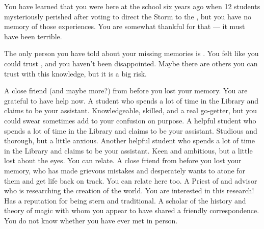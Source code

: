 \documentclass[char]{GL2020}
\begin{document}
\begin{itemz}[Notes]
    \item You have learned that you were here at the school six years ago when 12 students mysteriously perished after voting to direct the Storm to the \pShip{}, but you have no memory of those experiences. You are somewhat thankful for that — it must have been terrible.
    \item The only person you have told about your missing memories is \cInterpol{}. You felt like you could trust \cInterpol{\them}, and you haven’t been disappointed. Maybe there are others you can trust with this knowledge, but it is a big risk.
\end{itemz}

\begin{contacts}
    \contact{\cInterpol{}} A close friend (and maybe more?) from before you lost your memory. You are grateful to have \cInterpol{\their} help now.
    \contact{\cLibAssist{}} A student who spends a lot of time in the Library and claims to be your assistant. Knowledgeable, skilled, and a real go-getter, but you could swear \cLibAssist{\they} sometimes add to your confusion on purpose.
    \contact{\cPresident{}} A helpful student who spends a lot of time in the Library and claims to be your assistant. Studious and thorough, but a little anxious.
    \contact{\cAmbition{}} Another helpful student who spends a lot of time in the Library and claims to be your assistant. Keen and ambitious, but a little lost about the eyes. You can relate.
    \contact{\cChupAvenger{}} A close friend from before you lost your memory, who has made grievous mistakes and desperately wants to atone for them and get \cChupAvenger{\their} life back on track. You can relate here too.
    \contact{\cEbbPriest{}} A Priest of \cEbb{} and \pShippie{} advisor who is researching the creation of the world. You are interested in this research! Has a reputation for being stern and traditional.
    \contact{\cWildCard{}} A scholar of the history and theory of magic with whom you appear to have shared a friendly correspondence. You do not know whether you have ever met \cWildCard{\them} in person.
\end{contacts}
\end{document}
